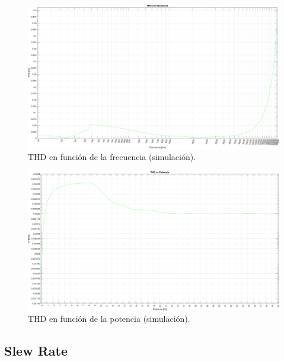 \begin{figure}[H]
    \centering
    \includegraphics[height=0.66 \textwidth, angle=90]{./img/simulaciones/THD/THD_vs_frequency_sim.png}
    \caption{THD en función de la frecuencia (simulación).}
    \label{fig:THD_vs_frequency_sim}
\end{figure}

\clearpage

\begin{figure}[H]
    \centering
    \includegraphics[height=0.66 \textwidth, angle=90]{./img/simulaciones/THD/THD_vs_power_sim.png}
    \caption{THD en función de la potencia (simulación).}
    \label{fig:THD_vs_power_sim}
\end{figure}

\clearpage

\subsection{Slew Rate}

